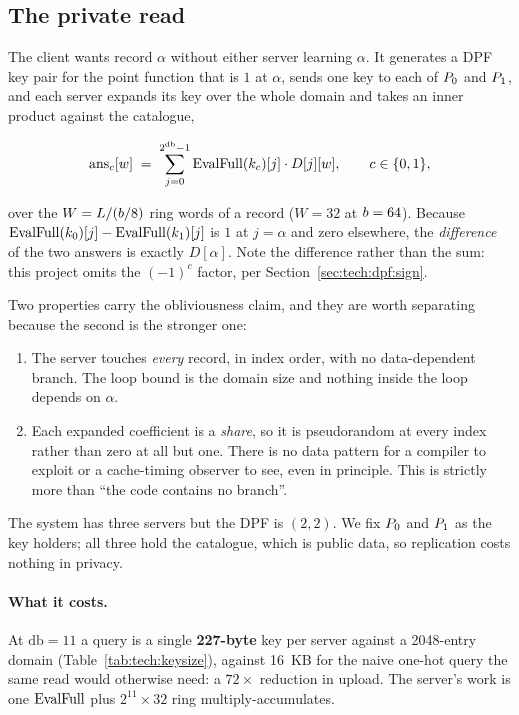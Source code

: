 \subsection{The private read}
\label{sec:tech:pir:read}

The client wants record $\alpha$ without either server learning $\alpha$. It
generates a DPF key pair for the point function that is $1$ at $\alpha$, sends
one key to each of $P_{0}$ and $P_{1}$, and each server expands its key
over the whole domain and takes an inner product against the catalogue,

\[
  \mathrm{ans}_c[w] \;=\; \sum_{j=0}^{2^{\mathrm{db}}-1}
    \operatorname{EvalFull}(k_c)[j] \cdot D[j][w],
  \qquad c \in \{0,1\},
\]

over the $W = L / (b/8)$ ring words of a record ($W = 32$ at $b = 64$).
Because $\operatorname{EvalFull}(k_0)[j] - \operatorname{EvalFull}(k_1)[j]$ is $1$ at $j = \alpha$ and zero
elsewhere, the \emph{difference} of the two answers is exactly $D[\alpha]$.
Note the difference rather than the sum: this project omits the $(-1)^c$ factor,
per Section~\ref{sec:tech:dpf:sign}.

Two properties carry the obliviousness claim, and they are worth separating
because the second is the stronger one:

\begin{enumerate}
  \item The server touches \emph{every} record, in index order, with no
    data-dependent branch. The loop bound is the domain size and nothing inside
    the loop depends on $\alpha$.
  \item Each expanded coefficient is a \emph{share}, so it is pseudorandom at
    every index rather than zero at all but one. There is no data pattern for a
    compiler to exploit or a cache-timing observer to see, even in principle.
    This is strictly more than ``the code contains no branch''.
\end{enumerate}

The system has three servers but the DPF is $(2,2)$. We fix $P_{0}$ and
$P_{1}$ as the key holders; all three hold the catalogue, which is public
data, so replication costs nothing in privacy.

\paragraph{What it costs.} At $\mathrm{db} = 11$ a query is a single
\textbf{227-byte} key per server against a 2048-entry domain
(Table~\ref{tab:tech:keysize}), against 16~KB for the naive one-hot query the
same read would otherwise need: a $72\times$ reduction in upload. The server's
work is one $\operatorname{EvalFull}$ plus $2^{11} \times 32$ ring multiply-accumulates.

